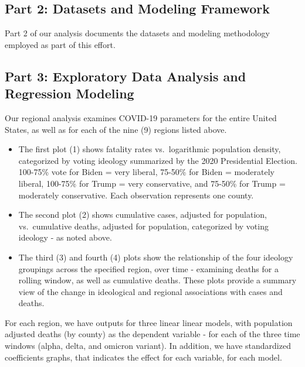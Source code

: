 \documentclass[
]{article}
\begin{document}
\hypertarget{part-2-datasets-and-modeling-framework}{%
\subsection{Part 2: Datasets and Modeling
Framework}\label{part-2-datasets-and-modeling-framework}}

Part 2 of our analysis documents the datasets and modeling methodology
employed as part of this effort.

\hypertarget{part-3-exploratory-data-analysis-and-regression-modeling}{%
\subsection{Part 3: Exploratory Data Analysis and Regression
Modeling}\label{part-3-exploratory-data-analysis-and-regression-modeling}}

Our regional analysis examines COVID-19 parameters for the entire United
States, as well as for each of the nine (9) regions listed above.

\begin{itemize}
\item
  The first plot (1) shows fatality rates vs.~logarithmic population
  density, categorized by voting ideology summarized by the 2020
  Presidential Election. 100-75\% vote for Biden = very liberal, 75-50\%
  for Biden = moderately liberal, 100-75\% for Trump = very
  conservative, and 75-50\% for Trump = moderately conservative. Each
  observation represents one county.
\item
  The second plot (2) shows cumulative cases, adjusted for population,
  vs.~cumulative deaths, adjusted for population, categorized by voting
  ideology - as noted above.
\item
  The third (3) and fourth (4) plots show the relationship of the four
  ideology groupings across the specified region, over time - examining
  deaths for a rolling window, as well as cumulative deaths. These plots
  provide a summary view of the change in ideological and regional
  associations with cases and deaths.
\end{itemize}

For each region, we have outputs for three linear linear models, with
population adjusted deaths (by county) as the dependent variable - for
each of the three time windows (alpha, delta, and omicron variant). In
addition, we have standardized coefficients graphs, that indicates the
effect for each variable, for each model.
\end{document}

